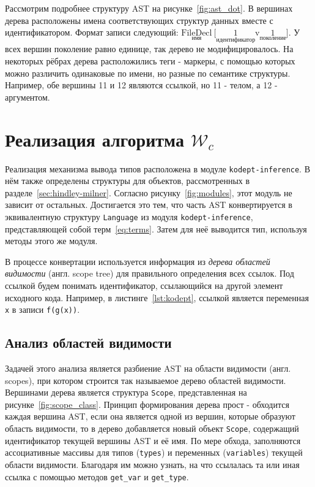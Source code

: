 Рассмотрим подробнее структуру AST на рисунке~\ref{fig:ast_dot}.
В вершинах дерева расположены имена соответствующих структур данных вместе с идентификатором.
Формат записи следующий: $\underset{\text{имя}}{\text{FileDecl}}~\text{[}\underset{\text{идентификатор}}{1}\text{v}\underset{\text{поколение}}{1}\text{]}$.
У всех вершин поколение равно единице, так дерево не модифицировалось.
На некоторых рёбрах дерева расположились теги - маркеры, с помощью которых можно различить одинаковые по имени, но разные по семантике структуры.
Например, обе вершины 11 и 12 являются ссылкой, но 11 - телом, а 12 - аргументом.


\section{Реализация алгоритма $\mathcal{W}_c$}
\label{sec:algorithm_W}

Реализация механизма вывода типов расположена в модуле \lstinline{kodept-inference}.
В нём также определены структуры для объектов, рассмотренных в разделе~\ref{sec:hindley-milner}.
Согласно рисунку~\ref{fig:modules}, этот модуль не зависит от остальных.
Достигается это тем, что часть AST конвертируется в эквивалентную структуру \lstinline{Language} из модуля \lstinline{kodept-inference}, представляющей собой терм~\eqref{eq:terms}.
Затем для неё выводится тип, используя методы этого же модуля.

В процессе конвертации используется информация из \textit{дерева областей видимости} (англ. scope tree) для правильного определения всех ссылок.
Под ссылкой будем понимать идентификатор, ссылающийся на другой элемент исходного кода.
Например, в листинге~\ref{lst:kodept}, ссылкой является переменная \lstinline{x} в записи \lstinline{f(g(x))}.

\subsection{Анализ областей видимости}
\label{subsec:scope_analysis}

Задачей этого анализа является разбиение AST на области видимости (англ. scopes), при котором строится так называемое дерево областей видимости.
Вершинами дерева является структура \lstinline{Scope}, представленная на рисунке~\ref{fig:scope_class}.
Принцип формирования дерева прост - обходится каждая вершина AST, если она является одной из вершин, которые образуют область видимости, то в дерево добавляется новый объект \lstinline{Scope}, содержащий идентификатор текущей вершины AST и её имя.
По мере обхода, заполняются ассоциативные массивы для типов (\lstinline{types}) и переменных (\lstinline{variables}) текущей области видимости.
Благодаря им можно узнать, на что ссылалась та или иная ссылка с помощью методов \lstinline{get_var} и \lstinline{get_type}.

